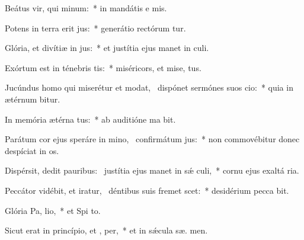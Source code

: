 \item Beátus vir, qui  minum:~* in mandátis e  mis.
\item Potens in terra erit  jus:~* generátio rectórum tur.
\item Glória, et divítiæ in  jus:~* et justítia ejus manet in  culi.
\item Exórtum est in ténebris  tis:~* miséricors, et mise,  tus.
\item Jucúndus homo qui miserétur et modat,~\pscross{} dispónet sermónes suos  cio:~* quia in ætérnum  bitur.
\item In memória ætérna  tus:~* ab auditióne ma  bit.
\item Parátum cor ejus speráre in mino,~\pscross{} confirmátum   jus:~* non commovébitur donec despíciat in os.
\item Dispérsit, dedit pauribus:~\pscross{} justítia ejus manet in sǽ culi,~* cornu ejus exaltá  ria.
\item Peccátor vidébit, et iratur,~\pscross{} déntibus suis fremet  scet:~* desidérium pecca bit.
\item Glória Pa,  lio,~* et Spi to.
\item Sicut erat in princípio, et ,  per,~* et in sǽcula sæ. men.
